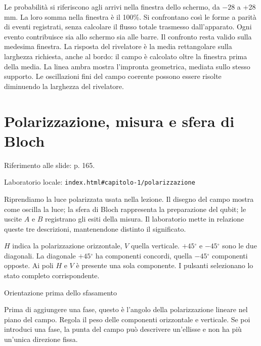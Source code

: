Le probabilità si riferiscono agli arrivi nella finestra dello schermo, da \(- 28\) a +28 mm. La loro somma nella finestra è il 100\%. Si confrontano così le forme a parità di eventi registrati, senza calcolare il flusso totale trasmesso dall'apparato. Ogni evento contribuisce sia allo schermo sia alle barre. Il confronto resta valido sulla medesima finestra. La risposta del rivelatore è la media rettangolare sulla larghezza richiesta, anche al bordo: il campo è calcolato oltre la finestra prima della media. La linea ambra mostra l'impronta geometrica, mediata sullo stesso supporto. Le oscillazioni fini del campo coerente possono essere risolte diminuendo la larghezza del rivelatore.\par




\Needspace{.43\textheight}
\section{Polarizzazione, misura e sfera di Bloch}
\label{c1-polarizzazione}

{\sffamily\small\color{Ink!70} Riferimento alle slide: p. 165.\par}

{\sffamily\small\color{Ink!70} Laboratorio locale: \nolinkurl{index.html#capitolo-1/polarizzazione}\par}

Riprendiamo la luce polarizzata usata nella lezione. Il disegno del campo mostra come oscilla la luce; la sfera di Bloch rappresenta la preparazione del qubit; le uscite \(A\) e \(B\) registrano gli esiti della misura. Il laboratorio mette in relazione queste tre descrizioni, mantenendone distinto il significato.\par



\(H\) indica la polarizzazione orizzontale, \(V\) quella verticale. \(+45{}^{\circ} \) e \(- 45{}^{\circ} \) sono le due diagonali. La diagonale \(+45{}^{\circ} \) ha componenti concordi, quella \(- 45{}^{\circ} \) componenti opposte. Ai poli \(H\) e \(V\) è presente una sola componente. I pulsanti selezionano lo stato completo corrispondente.\par

Orientazione prima dello sfasamento\par

Prima di aggiungere una fase, questo è l'angolo della polarizzazione lineare nel piano del campo. Regola il peso delle componenti orizzontale e verticale. Se poi introduci una fase, la punta del campo può descrivere un'ellisse e non ha più un'unica direzione fissa.\par

